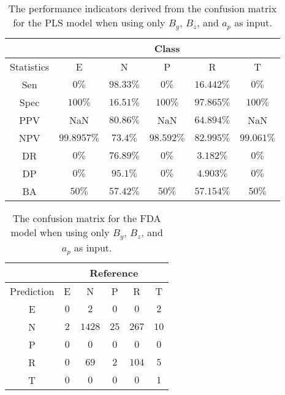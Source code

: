 \begin{table}[!ht]
	\centering
	\begin{tabular}{|c|c|c|c|c|c|}
		\hline
		 & \multicolumn{5}{c|}{Class} \\ \hline
		Statistics & E & N & P & R & T \\ \hline
		Sen & $0\%$ & $98.33\%$ & $0\%$ & $16.442\%$ & $0\%$ \\ \hline
		Spec & $100\%$ & $16.51\%$ & $100\%$ & $97.865\%$ & $100\%$ \\ \hline
		PPV & NaN & $80.86\%$ & NaN & $64.894\%$ & NaN \\ \hline
		NPV & $99.8957\%$ & $73.4\%$ & $98.592\%$ & $82.995\%$ & $99.061\%$ \\ \hline
		DR & $0\%$ & $76.89\%$ & $0\%$ & $3.182\%$ & $0\%$ \\ \hline
		DP & $0\%$ & $95.1\%$ & $0\%$ & $4.903\%$ & $0\%$ \\ \hline
		BA & $50\%$ & $57.42\%$ & $50\%$ & $57.154\%$ & $50\%$ \\ \hline
	\end{tabular}
	\caption{The performance indicators derived from the confusion matrix for the PLS model when using only $B_{y}$, $B_{z}$, and $a_{p}$ as input.}
	\label{tab:cs:reverse:yzap:pls}
\end{table}

\begin{table}[!ht]
	\centering
	\begin{tabular}{|c|c|c|c|c|c|}
		\hline
		 & \multicolumn{5}{|c|}{Reference} \\ \hline
		 Prediction & E & N & P & R & T \\ \hline
		 E & $0$ & $2$ & $0$ & $0$ & $2$ \\ \hline
		 N & $2$ & $1428$ & $25$ & $267$ & $10$ \\ \hline
		 P & $0$ & $0$ & $0$ & $0$ & $0$ \\ \hline
		 R & $0$ & $69$ & $2$ & $104$ & $5$ \\ \hline
		 T & $0$ & $0$ & $0$ & $0$ & $1$ \\ \hline
	\end{tabular}
	\caption{The confusion matrix for the FDA model when using only $B_{y}$, $B_{z}$, and $a_{p}$ as input.}
	\label{tab:cm:yzap:fda}
\end{table}


